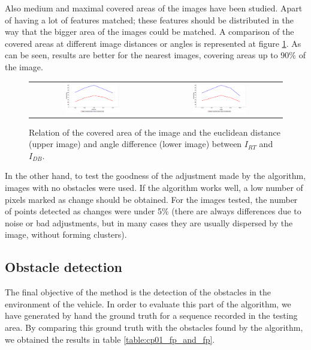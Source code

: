 Also medium and maximal covered areas of the images have been studied. Apart of having a lot of features matched; these features should be distributed in the way that the bigger area of the images could be matched. A comparison of the covered areas at different image distances or angles is represented at figure \ref{fig:cp01_area_covered}. As can be seen, results are better for the nearest images, covering areas up to 90\% of the image.

\begin{figure}[h!]
\centering
\begin{tabular}{cc}
\includegraphics[width=0.45\textwidth]{distance_vs_area}\label{fig:cp01_distance_vs_area} &
\includegraphics[width=0.45\textwidth]{angle_vs_area}\label{fig:cp01_angle_vs_area}
\end{tabular}
\caption{Relation of the covered area of the image and the euclidean distance (upper image) and angle difference (lower image) between $I_{RT}$ and $I_{DB}$.}\label{fig:cp01_area_covered}
\end{figure}

In the other hand, to test the goodness of the adjustment made by the algorithm, images with no obstacles were used. If the algorithm works well, a low number of pixels marked as change should be obtained. For the images tested, the number of points detected as changes were under 5\% (there are always differences due to noise or bad adjustments, but in many cases they are usually dispersed by the image, without forming clusters).

\subsection{Obstacle detection}\label{ch:chapter01_02_02}

The final objective of the method is the detection of the obstacles in the environment of the vehicle. In order to evaluate this part of the algorithm, we have generated by hand the ground truth for a sequence recorded in the testing area. By comparing this ground truth with the obstacles found by the algorithm, we obtained the results in table \ref{table:cp01_fp_and_fp}.

